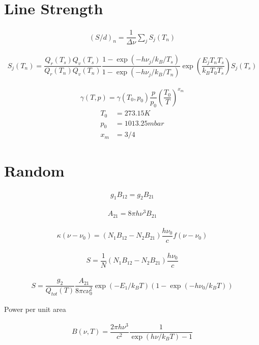 \section{Line Strength}

\begin{align}
	\left(S/d\right)_n  = \dfrac{1}{\Delta \nu} \sum_j S_j(T_n)
\end{align}

\begin{align}
	S_j(T_n)  = \dfrac{Q_r(T_s) Q_v(T_s)}{Q_r(T_n) Q_v(T_n)} \dfrac{1 - \exp(-h \nu_j / k_B/T_s)}{1 - \exp(-h \nu_j / k_B/T_n)}
		\exp\left(\dfrac{E_j T_n T_s}{k_B T_0 T_s}\right) S_j(T_s)
\end{align}

\begin{align}
	\gamma(T,p) = \gamma(T_0,p_0) \dfrac{p}{p_0} \left(\dfrac{T_0}{T}\right)^{x_m}
\end{align}
\begin{align}
	T_0 &= 273.15 K \\
	p_0 &= 1013.25 mbar \\
	x_m &= 3/4
\end{align}


\section{Random}

\begin{align}
	g_1 B_{12} = g_2 B_{21}
\end{align}

\begin{align}
	A_{21} = 8 \pi h \nu^3 B_{21}
\end{align}

\begin{align}
	\kappa(\nu - \nu_0)	= (N_1 B_{12} - N_2 B_{21}) \dfrac{h \nu_0}{c} f(\nu - \nu_0)
\end{align}

\begin{align}
	S = \dfrac{1}{N} (N_1 B_{12} - N_2 B_{21}) \dfrac{h \nu_0}{c}
\end{align}

\begin{align}
	S = \dfrac{g_2}{Q_{tot}(T)} \dfrac{A_{21}}{8  \pi c \nu_0^2} \exp(- E_1 / k_BT)
		(1 - \exp(- h \nu_0 / k_BT))
\end{align}

Power per unit area

\begin{align}
	B(\nu, T) = \dfrac{2 \pi h \nu^3}{c^2} \dfrac{1}{ \exp(h \nu /  k_B T) - 1}
\end{align}


